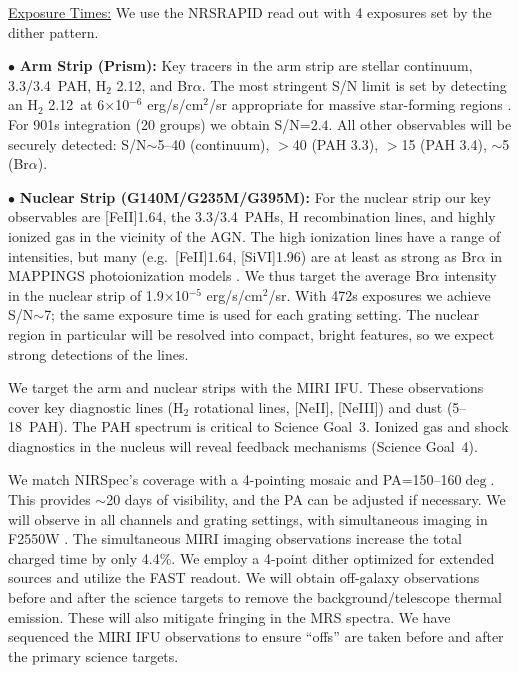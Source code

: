 \documentclass[12pt]{article}
\begin{document}
\noindent \underline{Exposure Times:} We use the NRSRAPID read out with 4 exposures set by the dither pattern.

\noindent $\bullet$ {\bf Arm Strip (Prism):} Key tracers in the arm strip are stellar continuum, 3.3/3.4\micron\ PAH, H$_2$ 2.12\micron, and Br$\alpha$.  The most stringent S/N limit is set by detecting an H$_2$ 2.12\micron\ at 6$\times$10$^{-6}$ erg/s/cm$^2$/sr appropriate for massive star-forming regions \citep{yeh2015}. For 901s integration (20 groups) we obtain S/N=$2.4$. All other observables will be securely detected: S/N$\sim$5--40 (continuum), $>$40 (PAH 3.3\micron), $>$15 (PAH 3.4\micron), $\sim$5 (Br$\alpha$).

\noindent $\bullet$ {\bf Nuclear Strip (G140M/G235M/G395M):} For the nuclear strip our key observables are [Fe{\small II}]1.64\micron, the 3.3/3.4\micron\ PAHs, H recombination lines, and highly ionized gas in the vicinity of the AGN.  The high ionization lines have a range of intensities, but many (e.g.\ [Fe{\small II}]1.64\micron, [Si{\small VI}]1.96\micron) are at least as strong as Br$\alpha$ in MAPPINGS photoionization models \citep{groves2006}. We thus target the average Br$\alpha$ intensity in the nuclear strip of 1.9$\times$10$^{-5}$ erg/s/cm$^2$/sr.  With 472s exposures we achieve S/N$\sim$7; the same exposure time is used for each grating setting. The nuclear region in particular will be resolved into compact, bright features, so we expect strong detections of the lines.

\vspace{0.1in}

 We target the arm and nuclear strips with the MIRI IFU.  These observations cover key diagnostic lines (H$_2$ rotational lines, [Ne{\small II}], [Ne{\small III}]) and dust (5--18\micron\ PAH). The PAH spectrum is critical to Science Goal~3. Ionized gas and shock diagnostics in the nucleus will reveal feedback mechanisms (Science Goal~4). 

We match NIRSpec's coverage with a 4-pointing mosaic and PA=150--160$\deg$. This provides $\sim$20 days of visibility, and the PA can be adjusted if necessary.  We will observe in all channels and grating settings, with simultaneous imaging in F2550W \citep[to study hot dust in star-forming regions:][]{calzetti2005,dale2017}. The simultaneous MIRI imaging observations increase the total charged time by only 4.4\%. We employ a 4-point dither optimized for extended sources and utilize the FAST readout. We will obtain off-galaxy observations before and after the science targets to remove the background/telescope thermal emission.  These will also mitigate fringing in the MRS spectra.  We have sequenced the MIRI IFU observations to ensure ``offs'' are taken before and after the primary science targets.
\end{document}
